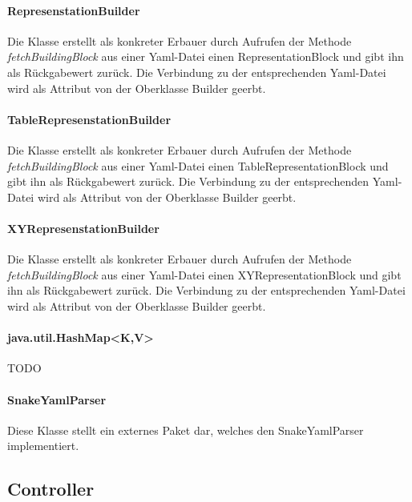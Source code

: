 \documentclass[parskip=full]{scrartcl}
\begin{document}
\paragraph{RepresenstationBuilder}
Die Klasse erstellt als konkreter Erbauer durch Aufrufen der Methode \textit{fetchBuildingBlock} aus einer Yaml-Datei einen RepresentationBlock und gibt ihn als Rückgabewert zurück. Die Verbindung zu der entsprechenden Yaml-Datei wird als Attribut von der Oberklasse Builder geerbt.
\paragraph{TableRepresenstationBuilder}
Die Klasse erstellt als konkreter Erbauer durch Aufrufen der Methode \textit{fetchBuildingBlock} aus einer Yaml-Datei einen TableRepresentationBlock und gibt ihn als Rückgabewert zurück. Die Verbindung zu der entsprechenden Yaml-Datei wird als Attribut von der Oberklasse Builder geerbt.
\paragraph{XYRepresenstationBuilder}
Die Klasse erstellt als konkreter Erbauer durch Aufrufen der Methode \textit{fetchBuildingBlock} aus einer Yaml-Datei einen XYRepresentationBlock und gibt ihn als Rückgabewert zurück. Die Verbindung zu der entsprechenden Yaml-Datei wird als Attribut von der Oberklasse Builder geerbt.
\paragraph{java.util.HashMap<K,V>}
TODO
\paragraph{SnakeYamlParser}
Diese Klasse stellt ein externes Paket dar, welches den SnakeYamlParser implementiert.

\clearpage
\subsection{Controller}
\end{document}
